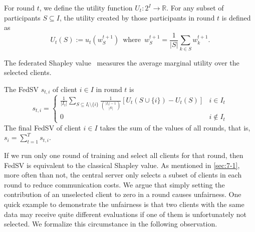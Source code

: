 For round $t $, we define the utility function $U_t : 2^{I} \to \mathbb{R}$. For any subset of participants $S \subseteq I$, the utility created by those participants in round $t$ is defined as
\[U_t(S) := u_t(w_S^{t+1})  \enspace\text{where}\enspace w_S^{t+1} = \frac{1}{|S|}\sum_{k\in S} w_k^{t+1}.\]

The federated Shapley value~\cite{wang2020principled} measures the average marginal utility over the selected clients. 
\begin{definition} \label{def:federated_sv}
    The FedSV $s_{t, i}$ of client $i \in I$ in round $t$ is 
    \begin{equation*}
    s_{t, i} = 
        \begin{cases} 
      \frac{1}{|I_t|} \sum\limits_{S \subseteq I_t \setminus\{i\}} \frac{1}{\binom{|I_t|-1}{|S|}} \left[U_t(S\cup\{i\}) - U_t(S)\right] & i \in I_t \\
      0 & i \notin I_t 
   \end{cases}
    \end{equation*}
    The final FedSV of client $i \in I$ takes the sum of the values of all rounds, that is, 
   $s_i = \sum_{t=1}^T s_{t, i}$.
\end{definition}

If we run only one round of training and select all clients for that round, then FedSV is equivalent to the classical Shapley value.  As mentioned in \autoref{sec:7-1}, more often than not, the central server only selects a subset of clients in each round to reduce communication costs. We argue that simply setting the contribution of an unselected client to zero in a round causes unfairness. One quick example to demonstrate the unfairness is that two clients with the same data may receive quite different evaluations if one of them is unfortunately not selected. We formalize this circumstance in the following observation. 

